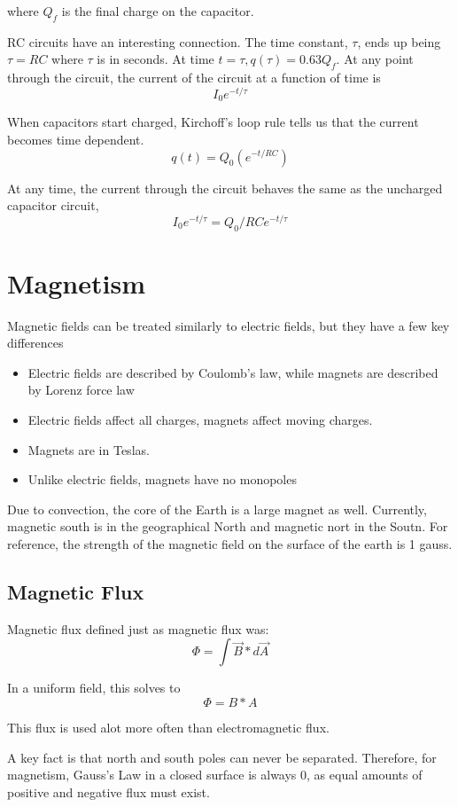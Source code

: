 \documentclass{article}
\begin{document}
where $Q_f$ is the final charge on the capacitor.

RC circuits have an interesting connection. The time constant, $\tau$, ends up being $\tau=RC$ where $\tau$ is in seconds. At time $t=\tau, q(\tau)=0.63 Q_f$.
At any point through the circuit, the current of the circuit at a function of time is $$I_0e^{-t/\tau}$$

When capacitors start charged, Kirchoff's loop rule tells us that the current becomes time dependent. $$q(t)=Q_0(e^{-t/RC})$$

At any time, the current through the circuit behaves the same as the uncharged capacitor circuit, $$I_0e^{-t/\tau}=Q_0/RC e^{-t/\tau}$$

\section{Magnetism}

Magnetic fields can be treated similarly to electric fields, but they have a few key differences

\begin{itemize}
	\item Electric fields are described by Coulomb's law, while magnets are described by Lorenz force law
	\item Electric fields affect all charges, magnets affect moving charges.
	\item Magnets are in Teslas.
	\item Unlike electric fields, magnets have no monopoles
\end{itemize}

Due to convection, the core of the Earth is a large magnet as well. Currently, magnetic south is in the geographical North and magnetic nort in the Soutn. For reference, the strength of the magnetic field on the surface of the earth is 1 gauss.

\subsection{Magnetic Flux}

Magnetic flux defined just as magnetic flux was:
$$\Phi=\int{\vec{B}* d\vec{A}}$$

In a uniform field, this solves to
$$\Phi=B*A$$

This flux is used alot more often than electromagnetic flux.

A key fact is that north and south poles can never be separated. Therefore, for magnetism, Gauss's Law in a closed surface is always 0, as equal amounts of positive and negative flux must exist.
\end{document}
